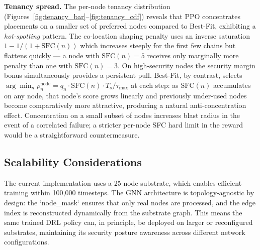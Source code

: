 \textbf{Tenancy spread.}
The per-node tenancy distribution (Figures~\ref{fig:tenancy_bar}--\ref{fig:tenancy_cdf}) reveals that PPO concentrates placements on a smaller set of preferred nodes compared to Best-Fit, exhibiting a \textit{hot-spotting} pattern. The co-location shaping penalty uses an inverse saturation $1 - 1/(1 + \text{SFC}(n))$ which increases steeply for the first few chains but flattens quickly — a node with $\text{SFC}(n) = 5$ receives only marginally more penalty than one with $\text{SFC}(n) = 3$. On high-security nodes the security margin bonus simultaneously provides a persistent pull. Best-Fit, by contrast, selects $\arg\min_n \rho_n^{\text{node}} = q_n \cdot \text{SFC}(n) \cdot T_s/\tau_{\max}$ at each step: as $\text{SFC}(n)$ accumulates on any node, that node's score grows linearly and previously under-used nodes become comparatively more attractive, producing a natural anti-concentration effect. Concentration on a small subset of nodes increases blast radius in the event of a correlated failure; a stricter per-node SFC hard limit in the reward would be a straightforward countermeasure.

\subsection{Scalability Considerations}

The current implementation uses a 25-node substrate, which enables efficient training within 100,000 timesteps. The GNN architecture is topology-agnostic by design: the `node\_mask` ensures that only real nodes are processed, and the edge index is reconstructed dynamically from the substrate graph. This means the same trained DRL policy can, in principle, be deployed on larger or reconfigured substrates, maintaining its security posture awareness across different network configurations.
